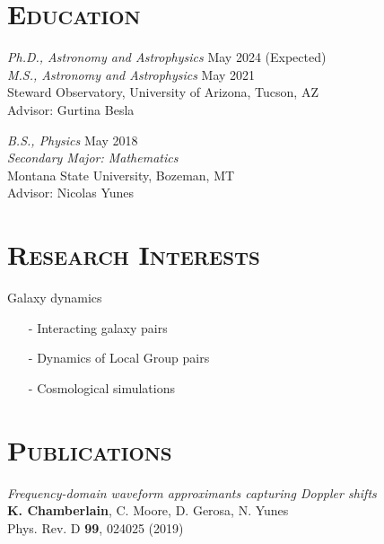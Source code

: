 \documentclass[margin]{res}
\begin{document}
\begin{resume}

\section{\textsc{Education}}

{\sl Ph.D., Astronomy and Astrophysics} \hfill        May 2024 (Expected)\\
{\sl M.S., Astronomy and Astrophysics} \hfill        May 2021\\
Steward Observatory, University of Arizona, Tucson, AZ\\
Advisor: Gurtina Besla


{\sl B.S., Physics} \hfill        May 2018 \\
\textit{Secondary Major: Mathematics}\\
Montana State University, Bozeman, MT\\
Advisor: Nicolas Yunes

 
\bigskip
\section{\textsc{Research Interests}}
Galaxy dynamics

\begin{itemize}
\item[-] Interacting galaxy pairs
\item[-] Dynamics of Local Group pairs 
\item[-] Cosmological simulations
\end{itemize}

\bigskip

\section{\textsc{Publications}}
\emph{Frequency-domain waveform approximants capturing Doppler shifts}\\
\textbf{K. Chamberlain}, C. Moore, D. Gerosa, N. Yunes\\
Phys. Rev. D \textbf{99}, 024025 (2019)


\end{resume}
\end{document}

